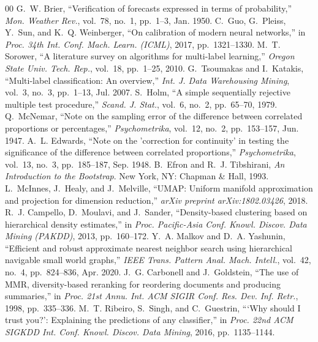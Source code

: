 \documentclass[journal]{IEEEtran}
\begin{document}
\begin{thebibliography}{00}
 G.~W. Brier, ``Verification of forecasts expressed in terms of probability,'' \textit{Mon. Weather Rev.}, vol.~78, no.~1, pp.~1--3, Jan. 1950.
 C.~Guo, G.~Pleiss, Y.~Sun, and K.~Q. Weinberger, ``On calibration of modern neural networks,'' in \textit{Proc. 34th Int. Conf. Mach. Learn. (ICML)}, 2017, pp.~1321--1330.
 M.~T. Sorower, ``A literature survey on algorithms for multi-label learning,'' \textit{Oregon State Univ. Tech. Rep.}, vol.~18, pp.~1--25, 2010.
 G.~Tsoumakas and I.~Katakis, ``Multi-label classification: An overview,'' \textit{Int. J. Data Warehousing Mining}, vol.~3, no.~3, pp.~1--13, Jul. 2007.
 S.~Holm, ``A simple sequentially rejective multiple test procedure,'' \textit{Scand. J. Stat.}, vol.~6, no.~2, pp.~65--70, 1979.
 Q.~McNemar, ``Note on the sampling error of the difference between correlated proportions or percentages,'' \textit{Psychometrika}, vol.~12, no.~2, pp.~153--157, Jun. 1947.
 A.~L. Edwards, ``Note on the 'correction for continuity' in testing the significance of the difference between correlated proportions,'' \textit{Psychometrika}, vol.~13, no.~3, pp.~185--187, Sep. 1948.
 B.~Efron and R.~J. Tibshirani, \textit{An Introduction to the Bootstrap}. New York, NY: Chapman \& Hall, 1993.
 L.~McInnes, J.~Healy, and J.~Melville, ``UMAP: Uniform manifold approximation and projection for dimension reduction,'' \textit{arXiv preprint arXiv:1802.03426}, 2018.
 R.~J. Campello, D.~Moulavi, and J.~Sander, ``Density-based clustering based on hierarchical density estimates,'' in \textit{Proc. Pacific-Asia Conf. Knowl. Discov. Data Mining (PAKDD)}, 2013, pp.~160--172.
 Y.~A. Malkov and D.~A. Yashunin, ``Efficient and robust approximate nearest neighbor search using hierarchical navigable small world graphs,'' \textit{IEEE Trans. Pattern Anal. Mach. Intell.}, vol.~42, no.~4, pp.~824--836, Apr. 2020.
 J.~G. Carbonell and J.~Goldstein, ``The use of MMR, diversity-based reranking for reordering documents and producing summaries,'' in \textit{Proc. 21st Annu. Int. ACM SIGIR Conf. Res. Dev. Inf. Retr.}, 1998, pp.~335--336.
 M.~T. Ribeiro, S.~Singh, and C.~Guestrin, ```Why should I trust you?': Explaining the predictions of any classifier,'' in \textit{Proc. 22nd ACM SIGKDD Int. Conf. Knowl. Discov. Data Mining}, 2016, pp.~1135--1144.

\end{thebibliography}
\end{document}
